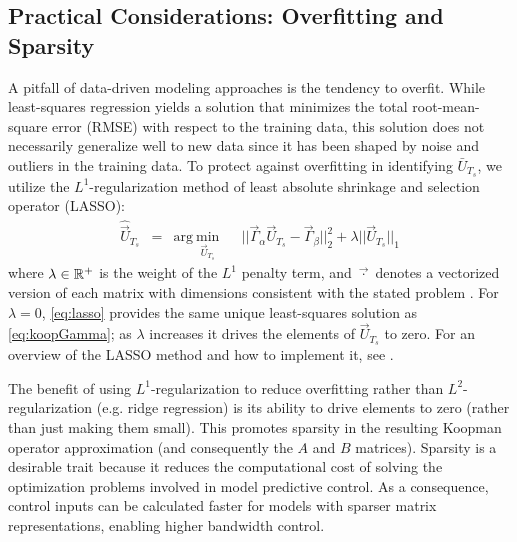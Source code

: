 \subsection{Practical Considerations: Overfitting and Sparsity}

A pitfall of data-driven modeling approaches is the tendency to overfit.
While least-squares regression yields a solution that minimizes the total root-mean-square error (RMSE) with respect to the training data, this solution does not necessarily generalize well to new data since it has been shaped by noise and outliers in the training data.
To protect against overfitting in identifying $\bar{U}_{T_s}$, we utilize the $L^1$-regularization method of least absolute shrinkage and selection operator (LASSO):
\begin{equation}
\begin{aligned}
\hat{\vec{U}}_{T_s} &= 
& \text{arg}~\underset{ \vec{U}_{T_s} }{\text{min}}
& & || \vec{\Gamma}_\alpha \vec{U}_{T_s} - \vec{\Gamma}_\beta ||_2^2 + \lambda || \vec{U}_{T_s} ||_1
\label{eq:lasso}
\end{aligned}
\end{equation}
where $\lambda \in \mathbb{R}^{+}$ is the weight of the $L^1$ penalty term, and $\vec{\cdot}$ denotes a vectorized version of each matrix with dimensions consistent with the stated problem .
For $\lambda = 0$, \eqref{eq:lasso} provides the same unique least-squares solution as \eqref{eq:koopGamma}; as $\lambda$ increases it drives the elements of $\vec{U}_{T_s}$ to zero.
For an overview of the LASSO method and how to implement it, see \citet{tibshirani1996regression}.

The benefit of using $L^1$-regularization to reduce overfitting rather than $L^2$-regularization (e.g. ridge regression) is its ability to drive elements to zero (rather than just making them small).
This promotes sparsity in the resulting Koopman operator approximation (and consequently the $A$ and $B$ matrices).
Sparsity is a desirable trait because it reduces the computational cost of solving the optimization problems involved in model predictive control. 
As a consequence, control inputs can be calculated faster for models with sparser matrix representations, enabling higher bandwidth control.

